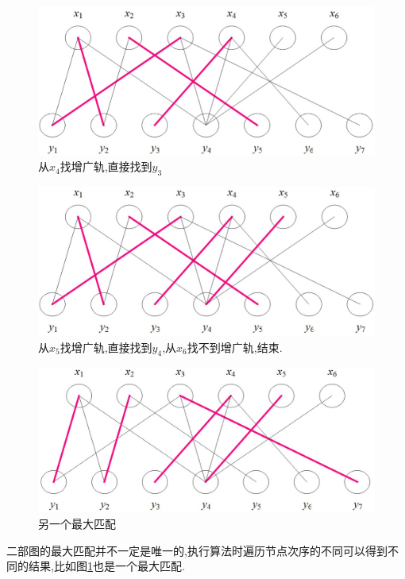 \documentclass[a4paper,cs4size,oneside,fancyhdr]{ctexrep}
\theoremstyle{nonumberplain}%
\theoremstyle{nonumberplain}%
\begin{document}
{{\begin{figure}[htbp]%
\centering
\includegraphics[scale=0.45]{p6.jpg}
\caption{从$x_4$找增广轨,直接找到$y_3$}
\end{figure}

\begin{figure}[htbp]%
\centering
\includegraphics[scale=0.45]{p7.jpg}
\caption{从$x_5$找增广轨,直接找到$y_4$,从$x_6$找不到增广轨,结束.}
\end{figure}

\begin{figure}[htbp]%
\centering
\includegraphics[scale=0.45]{p8.jpg}
\caption{另一个最大匹配}
\label{tu}
\end{figure}


二部图的最大匹配并不一定是唯一的,执行算法时遍历节点次序的不同可以得到不同的结果,比如图\ref{tu}也是一个最大匹配.

}}
\end{document}
